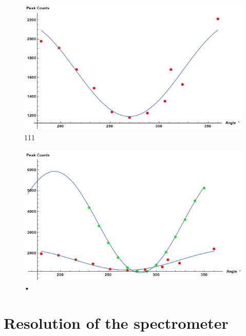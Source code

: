 \documentclass[openany,11pt,a4paper]{report}
\begin{document}
\begin{figure}[H]
\centering
\includegraphics[scale=1]{111peaks.PNG}
\caption{111}
\end{figure}



\begin{figure}[H]
\centering
\includegraphics[scale=1]{collectivepeaks.PNG}
\caption{•}
\end{figure}




\section{Resolution of the spectrometer}
\end{document}
